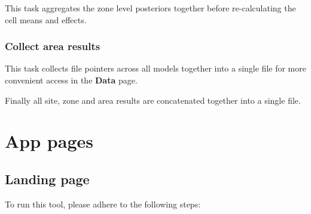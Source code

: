 \documentclass[
  8pt,
  a4paper]{article}
\begin{document}
This task aggregates the zone level posteriors together before
re-calculating the cell means and effects.

\subsubsection{Collect area results}\label{collect-area-results}

This task collects file pointers across all models together into a
single file for more convenient access in the \textbf{Data} page.

Finally all site, zone and area results are concatenated together into a
single file.

\section{App pages}\label{app-pages}

\subsection{Landing page}\label{sec-landing}

To run this tool, please adhere to the following steps:
\end{document}
